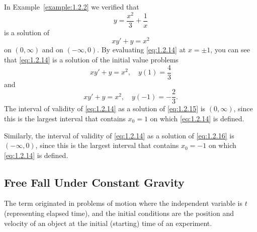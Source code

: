 \documentclass{ximera}
\begin{document}
\begin{example}\label{example:1.2.7}
In Example~\ref{example:1.2.2} we verified that
\begin{equation} \label{eq:1.2.14}
y=\frac{x^2}{3}+\frac{1}{x}
\end{equation}
is a solution of
$$
xy'+y=x^2
$$
on $(0,\infty)$ and on $(-\infty,0)$. By evaluating \eqref{eq:1.2.14} at
$x=\pm 1$, you can see that \eqref{eq:1.2.14} is a solution of the initial
value problems
\begin{equation} \label{eq:1.2.15}
xy'+y=x^2,\quad y(1)=\frac{4}{3}
\end{equation}
and
\begin{equation} \label{eq:1.2.16}
xy'+y=x^2,\quad y(-1)=-\frac{2}{3}.
\end{equation}
The interval of validity of \eqref{eq:1.2.14} as a solution of
\eqref{eq:1.2.15} is $(0,\infty)$, since this is the largest interval
that contains $x_0=1$ on which \eqref{eq:1.2.14} is defined. 


Similarly, the
interval of validity of \eqref{eq:1.2.14} as a solution of \eqref{eq:1.2.16}
is $(-\infty,0)$, since this is the largest interval that contains
$x_0=-1$ on which \eqref{eq:1.2.14} is defined.


\end{example}

\subsection*{Free Fall Under Constant Gravity}

The term   originated in problems
of motion where the independent variable is $t$
(representing elapsed time), and the initial conditions
are the position and velocity of an object at the initial
(starting) time of an experiment.
\end{document}
